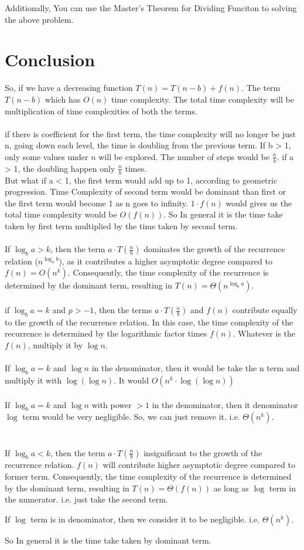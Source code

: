 \documentclass[]{article}
\theoremstyle{plain}
\theoremstyle{definition}
\begin{document}
Additionally, You can use the Master's Theorem for Dividing Funciton to solving the above problem.

\section{Conclusion}
So, if we have a decreasing function $T(n) = T(n - b) + f(n)$. The term $T(n - b)$ which has $O(n)$ time complexity. The total time complexity will be multiplication of time complexities of both the terms. 
\\
\\
if there is coefficient for the first term, the time complexity will no longer be just n, going down each level, the time is doubling from the previous term. 
If b > 1, only some values under $n$ will be explored. The number of steps would be $\frac{n}{b}$. if a > 1, the doubling happen only $\frac{n}{b}$ times. 
\\
But what if a < 1, the first term would add up to 1, according to geometric progression. Time Complexity of second term would be dominant than first or the first term would become 1 as n goes to infinity. $1 \cdot f(n)$ would gives us the total time complexity would be $O(f(n))$.
So In general it is the time take taken by first term multiplied by the time taken by second term.
\\
\\
If $\log_b{a} > k$, then the term $a \cdot T\left(\frac{n}{b}\right)$ dominates the growth of the recurrence relation ($n^{\log_a{b}}$), as it contributes a higher asymptotic degree compared to $f(n) = O(n^k)$. Consequently, the time complexity of the recurrence is determined by the dominant term, resulting in $T(n) = \Theta(n^{\log_b{a}})$.
\\
\\
if $\log_b{a} = k$ and $p > -1$, then the terms $a \cdot T\left(\frac{n}{b}\right)$ and $f(n)$ contribute equally to the growth of the recurrence relation. In this case, the time complexity of the recurrence is determined by the logarithmic factor times $f(n)$. Whatever is the $f(n)$, multiply it by $\log{n}$.
\\
\\
If $\log_b{a} = k$ and $\log{n}$ in the denominator, then it would be take the n term and multiply it with $\log{(\log{n})}$. It would $O(n^k \cdot \log{(\log{n})})$
\\
\\
If $\log_b{a} = k$ and $\log{n}$ with power $> 1$ in the denominator, then it denominator $\log$ term would be very negligible. So, we can just remove it. i.e. $\Theta(n^k)$.
\\
\\
\\
If $\log_b{a} < k$, then the term $a \cdot T\left(\frac{n}{b}\right)$ insignificant to the growth of the recurrence relation. $f(n)$ will contribute higher asymptotic degree compared to former term. Consequently, the time complexity of the recurrence is determined by the dominant term, resulting in $T(n) = \Theta(f(n))$ as long as $\log$ term in the numerator. i.e. just take the second term. 

If $\log$ term is in denominator, then we consider it to be negligible. i.e. $\Theta({n^k})$.

So In general it is the time take taken by dominant term.
\end{document}
